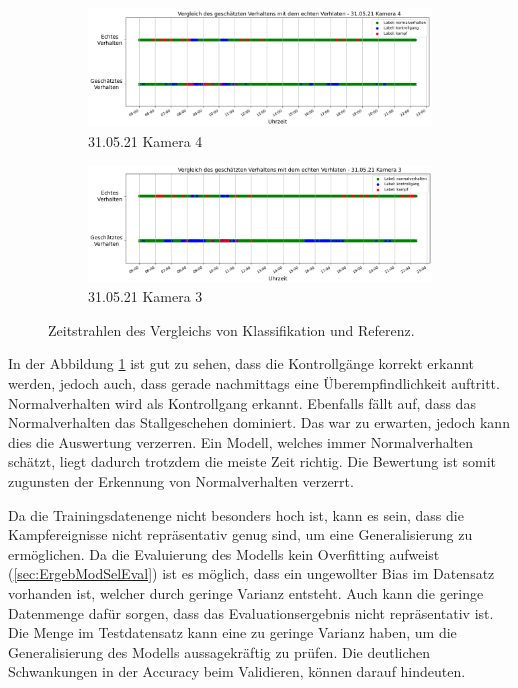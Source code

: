 \begin{figure}
     \centering
     \begin{subfigure}[b]{0.9\textwidth}
         \centering
         \includegraphics[width=\textwidth]{img/Plots/Simulation/Zeitstrahl Vergleich 31.05.21 cam 4.png}
         \caption{31.05.21 Kamera 4}
     \end{subfigure}
     \hfill
     \begin{subfigure}[b]{0.9\textwidth}
         \centering
         \includegraphics[width=\textwidth]{img/Plots/Simulation/Zeitstrahl Vergleich 31.05.21 cam 3.png}
         \caption{31.05.21 Kamera 3}
     \end{subfigure}
     \caption{Zeitstrahlen des Vergleichs von Klassifikation und Referenz.}
     \label{fig:zeitStrahlen}
\end{figure}


In der Abbildung \ref{fig:zeitStrahlen} ist gut zu sehen, dass die Kontrollgänge korrekt erkannt werden, jedoch auch, dass gerade nachmittags eine Überempfindlichkeit auftritt. Normalverhalten wird als Kontrollgang erkannt. Ebenfalls fällt auf, dass das Normalverhalten das Stallgeschehen dominiert. Das war zu erwarten, jedoch kann dies die Auswertung verzerren. Ein Modell, welches immer Normalverhalten schätzt, liegt dadurch trotzdem die meiste Zeit richtig. Die Bewertung ist somit zugunsten der Erkennung von Normalverhalten verzerrt. \par

Da die Trainingsdatenenge nicht besonders hoch ist, kann es sein, dass die Kampfereignisse nicht repräsentativ genug sind, um eine Generalisierung zu ermöglichen. Da die Evaluierung des Modells kein Overfitting aufweist (\autoref{sec:ErgebModSelEval}) ist es möglich, dass ein ungewollter Bias im Datensatz vorhanden ist, welcher durch geringe Varianz entsteht. Auch kann die geringe Datenmenge dafür sorgen, dass das Evaluationsergebnis nicht repräsentativ ist. Die Menge im Testdatensatz kann eine zu geringe Varianz haben, um die Generalisierung des Modells aussagekräftig zu prüfen. Die deutlichen Schwankungen in der Accuracy beim Validieren, können darauf hindeuten.\par

